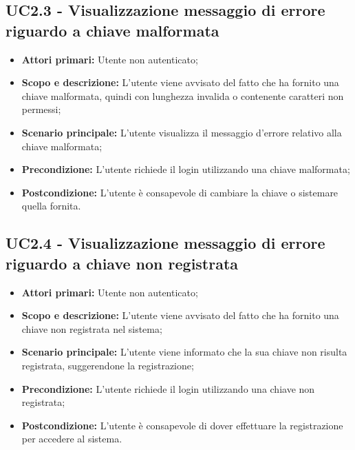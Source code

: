 \documentclass[AnalisiDeiRequisiti.tex]{subfiles}
\begin{document}
\subsection{UC2.3 - Visualizzazione messaggio di errore riguardo a chiave malformata}
\begin{itemize}
	\item \textbf{Attori primari:} Utente non autenticato;\\
	\item \textbf{Scopo e descrizione:} L'utente viene avvisato del fatto che ha fornito una chiave malformata, quindi con lunghezza invalida o contenente caratteri non permessi;\\
	\item \textbf{Scenario principale:} L'utente visualizza il messaggio d'errore relativo alla chiave malformata;\\
	\item \textbf{Precondizione:} L'utente richiede il login utilizzando una chiave malformata;\\
	\item \textbf{Postcondizione:} L'utente è consapevole di cambiare la chiave o sistemare quella fornita.\\
\end{itemize}
\subsection{UC2.4 - Visualizzazione messaggio di errore riguardo a chiave non registrata}
\begin{itemize}
	\item \textbf{Attori primari:} Utente non autenticato;\\
	\item \textbf{Scopo e descrizione:} L'utente viene avvisato del fatto che ha fornito una chiave non registrata nel sistema;\\
	\item \textbf{Scenario principale:} L'utente viene informato che la sua chiave non risulta registrata, suggerendone la registrazione;\\
	\item \textbf{Precondizione:} L'utente richiede il login utilizzando una chiave non registrata;\\
	\item \textbf{Postcondizione:} L'utente è consapevole di dover effettuare la registrazione per accedere al sistema.\\
\end{itemize}
\end{document}
